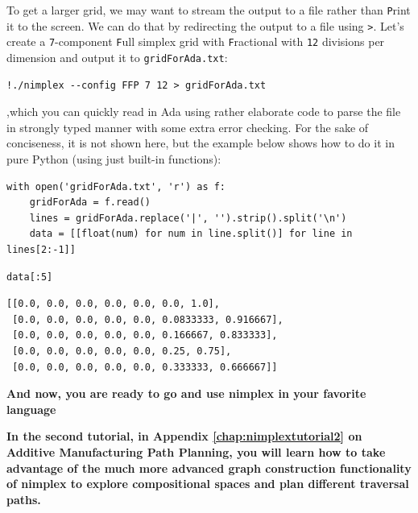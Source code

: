 To get a larger grid, we may want to stream the output to a file rather
than \texttt{P}rint it to the screen. We can do that by
redirecting the output to a file using \texttt{>}.
Let's create a \texttt{7}-component
\texttt{F}ull simplex grid with
\texttt{F}ractional with \texttt{12}
divisions per dimension and output it to
\texttt{gridForAda.txt}:

\begin{verbatim}
!./nimplex --config FFP 7 12 > gridForAda.txt
\end{verbatim}

,which you can quickly read in Ada using rather elaborate code to parse
the file in strongly typed manner with some extra error checking. For
the sake of conciseness, it is not shown here, but the example below
shows how to do it in pure Python (using just built-in functions):

\begin{verbatim}
with open('gridForAda.txt', 'r') as f:
    gridForAda = f.read()
    lines = gridForAda.replace('|', '').strip().split('\n')
    data = [[float(num) for num in line.split()] for line in lines[2:-1]]
\end{verbatim}

\begin{verbatim}
data[:5]
\end{verbatim}

\begin{verbatim}
[[0.0, 0.0, 0.0, 0.0, 0.0, 0.0, 1.0],
 [0.0, 0.0, 0.0, 0.0, 0.0, 0.0833333, 0.916667],
 [0.0, 0.0, 0.0, 0.0, 0.0, 0.166667, 0.833333],
 [0.0, 0.0, 0.0, 0.0, 0.0, 0.25, 0.75],
 [0.0, 0.0, 0.0, 0.0, 0.0, 0.333333, 0.666667]]
\end{verbatim}

\textbf{And now, you are ready to go and use nimplex in your favorite
language}

\textbf{In the second tutorial, in Appendix \ref{chap:nimplextutorial2} on 
Additive Manufacturing Path Planning, you will learn how to take advantage of the much more advanced graph construction functionality of nimplex to explore compositional spaces
and plan different traversal paths.}
